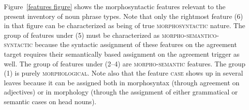 Figure~\ref{features figure} shows the morphosyntactic features relevant to the present inventory of noun phrase types. Note that only the rightmost feature (6) in that figure can be characterized as being of true \textsc{morphosyntactic} nature. The group of features under (5) must be characterized as \textsc{morpho-semantico-syntactic} because the syntactic assignment of these features on the agreement target requires their semantically based assignment on the agreement trigger as well. The group of features under (2–4) are \textsc{morpho-semantic} features. The group (1) is purely \textsc{morphological}. Note also that the feature \textsc{case} shows up in several leaves because  it can be assigned both in morphosyntax (through agreement on adjectives) or in morphology (through the assignment of either grammatical or semantic cases on head nouns). 
